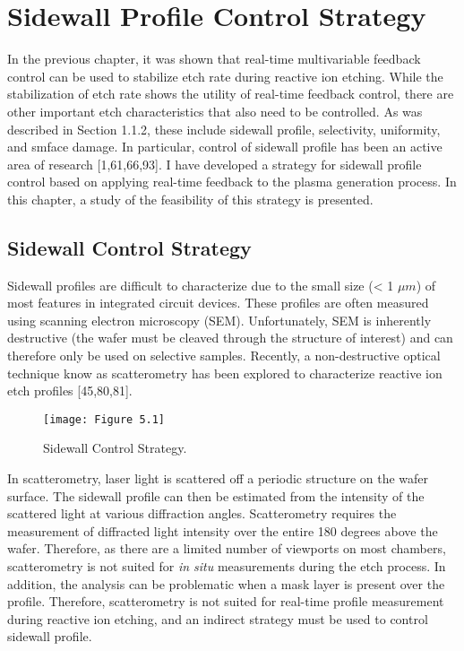 \chapter{Sidewall Profile Control Strategy}

\tab In the previous chapter, it was shown that real-time multivariable feedback control can
be used to stabilize etch rate during reactive ion etching. While the stabilization of etch rate shows the utility of real-time feedback control, there are other important etch characteristics that also need to be controlled. As was described in Section 1.1.2, these include sidewall profile, selectivity, uniformity, and smface damage. In particular, control of sidewall profile has been an active area of research [1,61,66,93]. I have developed a strategy for sidewall profile control based on applying real-time feedback to the plasma generation process. In this chapter, a study of the feasibility of this strategy is presented.


\section{Sidewall Control Strategy}

\tab Sidewall profiles are difficult to characterize due to the small size (< 1 $\mu m$) of most features in integrated circuit devices. These profiles are often measured using scanning
electron microscopy (SEM). Unfortunately, SEM is inherently destructive (the wafer must
be cleaved through the structure of interest) and can therefore only be used on selective
samples. Recently, a non-destructive optical technique know as scatterometry has been explored to characterize reactive ion etch profiles [45,80,81]. 

\begin{figure}[H]
	\centering
	\texttt{[image: Figure 5.1]}
	\bf\caption{  Sidewall Control Strategy.}
	\label{fig:5.1}
\end{figure}

\noindent In scatterometry, laser light
is scattered off a periodic structure on the wafer surface. The sidewall profile can then
be estimated from the intensity of the scattered light at various diffraction angles. Scatterometry requires the measurement of diffracted light intensity over the entire 180 degrees above the wafer. Therefore, as there are a limited number of viewports on most chambers, scatterometry is not suited for \textit{in situ} measurements during the etch process. In addition, the analysis can be problematic when a mask layer is present over the profile. Therefore, scatterometry is not suited for real-time profile measurement during reactive ion etching, and an indirect strategy must be used to control sidewall profile.


